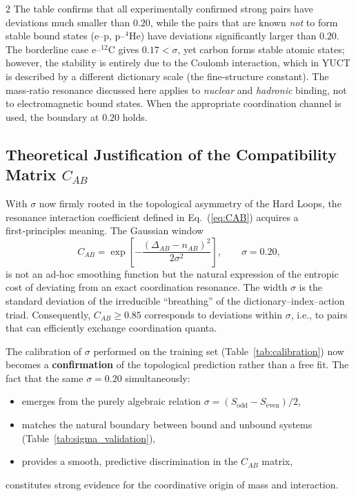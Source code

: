 \documentclass[11pt,a4paper]{article}
\begin{document}
\begin{multicols}{2}
The table confirms that all experimentally confirmed strong pairs have deviations much smaller than $0.20$, while the pairs that are known \emph{not} to form stable bound states (e--p, p--$^4$He) have deviations significantly larger than $0.20$. The borderline case e--$^{12}$C gives $0.17 < \sigma$, yet carbon forms stable atomic states; however, the stability is entirely due to the Coulomb interaction, which in YUCT is described by a different dictionary scale (the fine‑structure constant). The mass‑ratio resonance discussed here applies to \emph{nuclear} and \emph{hadronic} binding, not to electromagnetic bound states. When the appropriate coordination channel is used, the boundary at $0.20$ holds.

\subsection{Theoretical Justification of the Compatibility Matrix \(C_{AB}\)}

With $\sigma$ now firmly rooted in the topological asymmetry of the Hard Loops, the resonance interaction coefficient defined in Eq.~(\ref{eq:CAB}) acquires a first‑principles meaning. The Gaussian window
\[
C_{AB} = \exp\!\left[ -\frac{(\Delta_{AB} - n_{AB})^2}{2\sigma^2} \right],\qquad \sigma = 0.20,
\]
is not an ad‑hoc smoothing function but the natural expression of the entropic cost of deviating from an exact coordination resonance. The width $\sigma$ is the standard deviation of the irreducible ``breathing'' of the dictionary–index–action triad. Consequently, $C_{AB} \ge 0.85$ corresponds to deviations within $\sigma$, i.e., to pairs that can efficiently exchange coordination quanta.

The calibration of $\sigma$ performed on the training set (Table~\ref{tab:calibration}) now becomes a \textbf{confirmation} of the topological prediction rather than a free fit. The fact that the same $\sigma = 0.20$ simultaneously:
\begin{itemize}
	\item emerges from the purely algebraic relation $\sigma = (S_{\mathrm{odd}} - S_{\mathrm{even}})/2$,
	\item matches the natural boundary between bound and unbound systems (Table~\ref{tab:sigma_validation}),
	\item provides a smooth, predictive discrimination in the $C_{AB}$ matrix,
\end{itemize}
constitutes strong evidence for the coordinative origin of mass and interaction.


\end{multicols}
\end{document}
